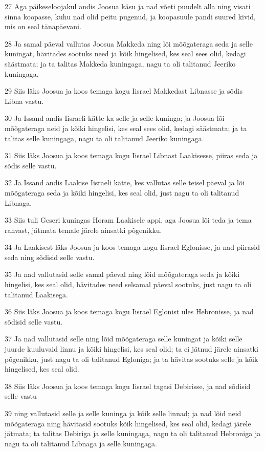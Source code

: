 \par 27 Aga päikeseloojakul andis Joosua käsu ja nad võeti puudelt alla ning visati sinna koopasse, kuhu nad olid peitu pugenud, ja koopasuule pandi suured kivid, mis on seal tänapäevani.
\par 28 Ja samal päeval vallutas Joosua Makkeda ning lõi mõõgateraga seda ja selle kuningat, hävitades sootuks need ja kõik hingelised, kes seal sees olid, kedagi säästmata; ja ta talitas Makkeda kuningaga, nagu ta oli talitanud Jeeriko kuningaga.
\par 29 Siis läks Joosua ja koos temaga kogu Iisrael Makkedast Libnasse ja sõdis Libna vastu.
\par 30 Ja Issand andis Iisraeli kätte ka selle ja selle kuninga; ja Joosua lõi mõõgateraga neid ja kõiki hingelisi, kes seal sees olid, kedagi säästmata; ja ta talitas selle kuningaga, nagu ta oli talitanud Jeeriko kuningaga.
\par 31 Siis läks Joosua ja koos temaga kogu Iisrael Libnast Laakisesse, piiras seda ja sõdis selle vastu.
\par 32 Ja Issand andis Laakise Iisraeli kätte, kes vallutas selle teisel päeval ja lõi mõõgateraga seda ja kõiki hingelisi, kes seal olid, just nagu ta oli talitanud Libnaga.
\par 33 Siis tuli Geseri kuningas Horam Laakisele appi, aga Joosua lõi teda ja tema rahvast, jätmata temale järele ainsatki põgenikku.
\par 34 Ja Laakisest läks Joosua ja koos temaga kogu Iisrael Eglonisse, ja nad piirasid seda ning sõdisid selle vastu.
\par 35 Ja nad vallutasid selle samal päeval ning lõid mõõgateraga seda ja kõiki hingelisi, kes seal olid, hävitades need selsamal päeval sootuks, just nagu ta oli talitanud Laakisega.
\par 36 Siis läks Joosua ja koos temaga kogu Iisrael Eglonist üles Hebronisse, ja nad sõdisid selle vastu.
\par 37 Ja nad vallutasid selle ning lõid mõõgateraga selle kuningat ja kõiki selle juurde kuuluvaid linnu ja kõiki hingelisi, kes seal olid; ta ei jätnud järele ainsatki põgenikku, just nagu ta oli talitanud Egloniga; ja ta hävitas sootuks selle ja kõik hingelised, kes seal olid.
\par 38 Siis läks Joosua ja koos temaga kogu Iisrael tagasi Debirisse, ja nad sõdisid selle vastu
\par 39 ning vallutasid selle ja selle kuninga ja kõik selle linnad; ja nad lõid neid mõõgateraga ning hävitasid sootuks kõik hingelised, kes seal olid, kedagi järele jätmata; ta talitas Debiriga ja selle kuningaga, nagu ta oli talitanud Hebroniga ja nagu ta oli talitanud Libnaga ja selle kuningaga.
